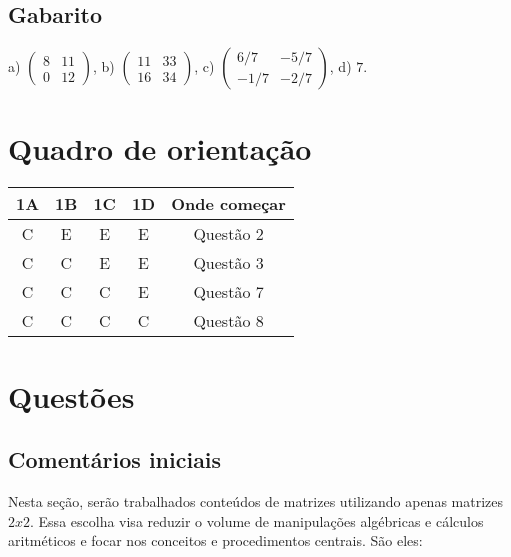 \documentclass[main.tex]{subfiles}
\begin{document}
\paraTutores
\subsection{Gabarito}

a) $\begin{pmatrix}8 & 11 \\ 0 & 12\end{pmatrix}$, b) $\begin{pmatrix}11 & 33 \\ 16 & 34\end{pmatrix}$, c) $\begin{pmatrix}6/7 & -5/7 \\ -1/7 & -2/7\end{pmatrix}$, d) $7$.

\section{Quadro de orientação}

\begin{center}
 \begin{tabular}{|c c c c |c|} 
 \hline
 1A & 1B & 1C & 1D & Onde começar\\
 \hline
 C & E & E & E & Questão 2 \\ 
 \hline
 C & C & E & E & Questão 3 \\ 
 \hline
 C & C & C & E & Questão 7 \\ 
 \hline
 C & C & C & C & Questão 8 \\ 
 \hline
\end{tabular}
\end{center}


\paraAmbos


\section{Questões}

\paraTutores

\subsection{Comentários iniciais}

Nesta seção, serão trabalhados conteúdos de matrizes utilizando apenas matrizes $2x2$. Essa escolha visa reduzir o volume de manipulações algébricas e cálculos aritméticos e focar nos conceitos e procedimentos centrais. São eles:
\end{document}
